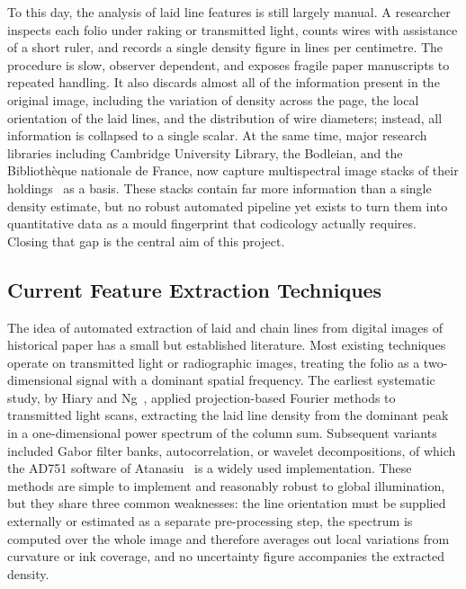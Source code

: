 To this day, the analysis of laid line features is still largely
manual. A researcher inspects each folio under raking or transmitted
light, counts wires with assistance of a short ruler, and records a single density
figure in lines per centimetre. The procedure is slow,
observer dependent, and exposes fragile paper manuscripts to repeated
handling. It also discards almost all of the information present in
the original image, including the variation of density across the page, the
local orientation of the laid lines, and the distribution of wire
diameters; instead, all information is collapsed to a single scalar. At the same time,
major research libraries including Cambridge University Library,
the Bodleian, and the Bibliothèque nationale de France, now
 capture multispectral image stacks of their
holdings~\cite{miniare} as a basis. These stacks contain far more
information than a single density estimate, but no robust automated
pipeline yet exists to turn them into quantitative
 data as a mould fingerprint that codicology actually requires. Closing
that gap is the central aim of this project.

\subsection{Current Feature Extraction Techniques}
\label{sec:bg:prior_extraction}

The idea of automated extraction of laid and chain lines from digital images of
historical paper has a small but established literature. Most existing
techniques operate on transmitted light or radiographic images,
treating the folio as a two-dimensional signal with a dominant spatial
frequency. The earliest systematic study, by Hiary and
Ng~\cite{hiary2007paper}, applied projection-based Fourier methods to
 transmitted light scans, extracting the laid line density
from the dominant peak in a one-dimensional power spectrum of the
column sum. Subsequent variants included Gabor filter banks,
autocorrelation, or wavelet decompositions, of which the AD751
software of Atanasiu~\cite{atanasiu_ad751} is a widely used
implementation. These methods are simple to implement and reasonably
robust to global illumination, but they share three common weaknesses:
the line orientation must be supplied externally or estimated as a
separate pre-processing step, the spectrum is computed over the whole
image and therefore averages out local variations from curvature or
ink coverage, and no uncertainty figure accompanies the extracted
density.

